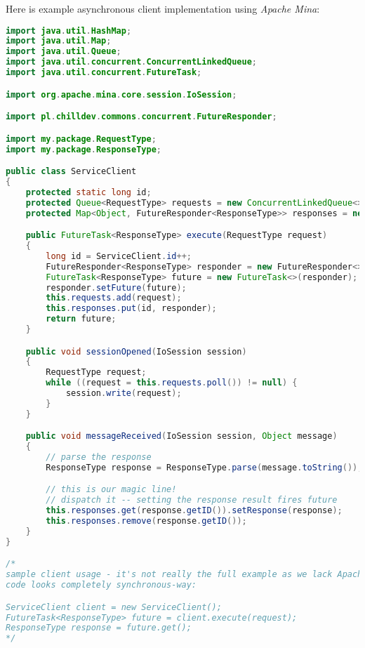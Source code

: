 Here is example asynchronous client implementation using \emph{Apache Mina}:

\begin{lstlisting}[language=Java]
import java.util.HashMap;
import java.util.Map;
import java.util.Queue;
import java.util.concurrent.ConcurrentLinkedQueue;
import java.util.concurrent.FutureTask;

import org.apache.mina.core.session.IoSession;

import pl.chilldev.commons.concurrent.FutureResponder;

import my.package.RequestType;
import my.package.ResponseType;

public class ServiceClient
{
    protected static long id;
    protected Queue<RequestType> requests = new ConcurrentLinkedQueue<>();
    protected Map<Object, FutureResponder<ResponseType>> responses = new HashMap<>();

    public FutureTask<ResponseType> execute(RequestType request)
    {
        long id = ServiceClient.id++;
        FutureResponder<ResponseType> responder = new FutureResponder<>();
        FutureTask<ResponseType> future = new FutureTask<>(responder);
        responder.setFuture(future);
        this.requests.add(request);
        this.responses.put(id, responder);
        return future;
    }

    public void sessionOpened(IoSession session)
    {
        RequestType request;
        while ((request = this.requests.poll()) != null) {
            session.write(request);
        }
    }

    public void messageReceived(IoSession session, Object message)
    {
        // parse the response
        ResponseType response = ResponseType.parse(message.toString());

        // this is our magic line!
        // dispatch it -- setting the response result fires future
        this.responses.get(response.getID()).setResponse(response);
        this.responses.remove(response.getID());
    }
}

/*
sample client usage - it's not really the full example as we lack Apache Mina wrapper,
code looks completely synchronous-way:

ServiceClient client = new ServiceClient();
FutureTask<ResponseType> future = client.execute(request);
ResponseType response = future.get();
*/
\end{lstlisting}
